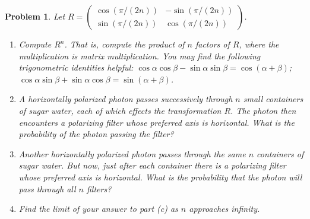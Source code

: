 \documentclass[12pt]{article}
\newtheorem{problem}{Problem}
\theoremstyle{remark}  %
\begin{document}
    \begin{problem}
        Let $R=\begin{pmatrix}
            \cos(\pi/(2n)) & -\sin(\pi/(2n)) \\
            \sin(\pi/(2n)) & \cos(\pi/(2n))
        \end{pmatrix}$.
        \begin{enumerate}[label=(\alph*)]
            \item Compute $R^n$. That is, compute the product of $n$ factors of $R$, where the multiplication is matrix multiplication. You may find the following trigonometric identities helpful: $\cos\alpha\cos\beta - \sin\alpha\sin\beta = \cos(\alpha + \beta)$; $\cos\alpha\sin\beta + \sin\alpha\cos\beta = \sin(\alpha + \beta)$.
            \item A horizontally polarized photon passes successively through $n$ small containers of sugar water, each of which effects the transformation $R$. The photon then encounters a polarizing filter whose preferred axis is horizontal. What is the probability of the photon passing the filter?
            \item Another horizontally polarized photon passes through the same $n$ containers of sugar water. But now, just after each container there is a polarizing filter whose preferred axis is horizontal. What is the probability that the photon will pass through all $n$ filters?
            \item Find the limit of your answer to part (c) as $n$ approaches infinity.
        \end{enumerate}
    \end{problem}
\end{document}
